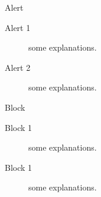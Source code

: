 \documentclass[t]{beamer}
\begin{document}
\begin{frame}
\begin{alertblock}{Alert}
\begin{description}
\item[Alert 1] some explanations.
\item[Alert 2] some explanations.
\end{description}
\end{alertblock}

\begin{block}{Block}
\begin{description}
\item[Block 1] some explanations.
\item[Block 1] some explanations.
\end{description}
\end{block}
\end{frame}
\end{document}
